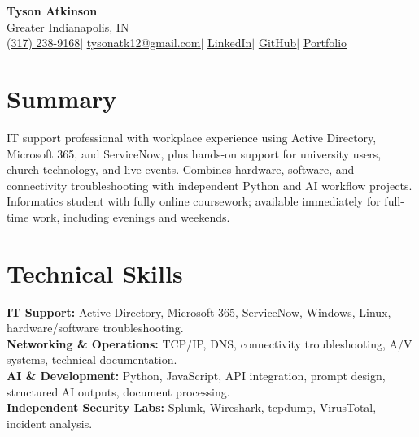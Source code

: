 \documentclass[10pt,letterpaper]{article}
\begin{document}
\fontsize{10.15}{11.65}\selectfont
\begin{center}
  {\fontsize{27}{30}\selectfont\textbf{Tyson Atkinson}}\\[2pt]
  {\fontsize{9.5}{11.5}\selectfont Greater Indianapolis, IN}\\
  {\fontsize{9.5}{11.5}\selectfont
   \href{tel:+13172389168}{\underline{(317) 238-9168}}\enspace$|$\enspace
   \href{mailto:tysonatk12@gmail.com}{\underline{tysonatk12@gmail.com}}\enspace$|$\enspace
   \href{https://www.linkedin.com/in/tysonatkinson/}{\underline{LinkedIn}}\enspace$|$\enspace
   \href{https://github.com/Tysonatk12}{\underline{GitHub}}\enspace$|$\enspace
   \href{https://tysonatk12.github.io/tysonatkinson/}{\underline{Portfolio}}}
\end{center}
\vspace{-8pt}

\section{Summary}
IT support professional with workplace experience using Active Directory, Microsoft 365, and ServiceNow, plus hands-on support for university users, church technology, and live events. Combines hardware, software, and connectivity troubleshooting with independent Python and AI workflow projects. Informatics student with fully online coursework; available immediately for full-time work, including evenings and weekends.

\section{Technical Skills}
\textbf{IT Support:} Active Directory, Microsoft 365, ServiceNow, Windows, Linux, hardware/software troubleshooting.\\
\textbf{Networking \& Operations:} TCP/IP, DNS, connectivity troubleshooting, A/V systems, technical documentation.\\
\textbf{AI \& Development:} Python, JavaScript, API integration, prompt design, structured AI outputs, document processing.\\
\textbf{Independent Security Labs:} Splunk, Wireshark, tcpdump, VirusTotal, incident analysis.
\end{document}
